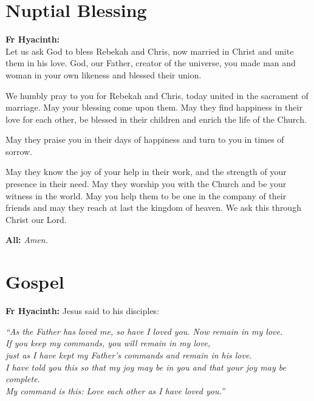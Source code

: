 \documentclass[12pt,landscape]{article}
\begin{document}
\newpage
\begin{multicols}{2}

\section*{Nuptial Blessing}

\textbf{Fr Hyacinth:} \\
Let us ask God to bless Rebekah and Chris, now married in Christ and unite them in his love. God, our Father, creator of the universe, you made man and woman in your own likeness and blessed their union.

\vspace{0.5em}

We humbly pray to you for Rebekah and Chris, today united in the sacrament of marriage. May your blessing come upon them. May they find happiness in their love for each other, be blessed in their children and enrich the life of the Church.

May they praise you in their days of happiness and turn to you in times of sorrow.

May they know the joy of your help in their work, and the strength of your presence in their need. May they worship you with the Church and be your witness in the world. May you help them to be one in the company of their friends and may they reach at last the kingdom of heaven. We ask this through Christ our Lord.

\vspace{0.5em}
\textbf{All:} \textit{Amen.}

\columnbreak

\section*{Gospel}

\textbf{Fr Hyacinth:} Jesus said to his disciples:

\vspace{0.5em}

\textit{“As the Father has loved me, so have I loved you. Now remain in my love.\\
If you keep my commands, you will remain in my love,\\
just as I have kept my Father’s commands and remain in his love.\\
I have told you this so that my joy may be in you and that your joy may be complete.\\
My command is this: Love each other as I have loved you.”}


\end{multicols}
\end{document}
